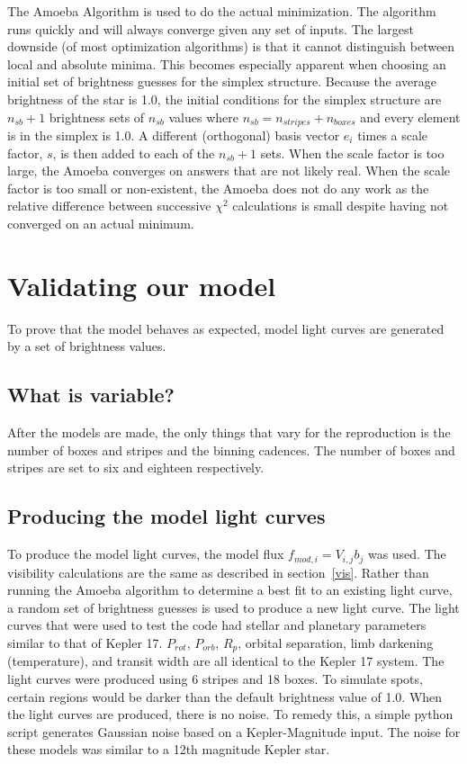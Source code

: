 \documentclass[iop]{emulateapj}
\newcommand{\fmod}{\mbox{$f_{mod,i}$}}
\begin{document}
The Amoeba Algorithm is used to do the actual minimization. The algorithm runs quickly and will always converge given any set of inputs. The largest downside (of most optimization algorithms) is that it cannot distinguish between local and absolute minima. This becomes especially apparent when choosing an initial set of brightness guesses for the simplex structure. Because the average brightness of the star is 1.0, the initial conditions for the simplex structure are $n_{sb} + 1$ brightness sets of $n_{sb}$ values where $n_{sb} = n_{stripes} + n_{boxes}$ and every element is in the simplex is 1.0. A different (orthogonal) basis vector $e_i$ times a scale factor, $s$, is then added to each of the $n_{sb} + 1$ sets. When the scale factor is too large, the Amoeba converges on answers that are not likely real. When the scale factor is too small or non-existent, the Amoeba does not do any work as the relative difference between successive $\chi^2$ calculations is small despite having not converged on an actual minimum.

\section{Validating our model \label{validation}}
To prove that the model behaves as expected, model light curves are generated by a set of brightness values.
\subsection{What is variable? \label{variable}}
After the models are made, the only things that vary for the reproduction is the number of boxes and stripes and the binning cadences. The number of boxes and stripes are set to six and eighteen respectively.  %

\subsection{Producing the model light curves \label{modelLC}}
To produce the model light curves, the model flux $\fmod = V_{i,j} b_j$ was used. The visibility calculations are the same as described in section~\ref{vis}. Rather than running the Amoeba algorithm to determine a best fit to an existing light curve, a random set of brightness guesses is used to produce a new light curve. The light curves that were used to test the code had stellar and planetary parameters similar to that of Kepler 17. $P_{rot}$, $P_{orb}$, $R_p$, orbital separation, limb darkening (temperature), and transit width are all identical to the Kepler 17 system. The light curves were produced using 6 stripes and 18 boxes. To simulate spots, certain regions would be darker than the default brightness value of 1.0. When the light curves are produced, there is no noise. To remedy this, a simple python script generates Gaussian noise based on a Kepler-Magnitude input. The noise for these models was similar to a 12th magnitude Kepler star.
\end{document}
